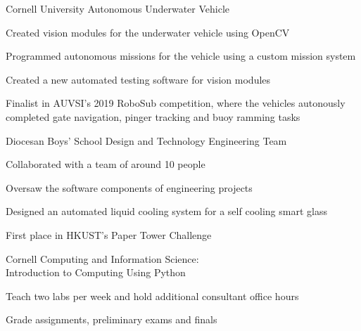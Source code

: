 \documentclass{resume}
\begin{document}
\begin{experience}
    \begin{entryleft}{Cornell University Autonomous Underwater Vehicle}
        \begin{description}
            \item Created vision modules for the underwater vehicle using OpenCV
            \item Programmed autonomous missions for the vehicle using a custom mission system
            \item Created a new automated testing software for vision modules
            \item Finalist in AUVSI's 2019 RoboSub competition, where the vehicles autonously completed gate navigation, pinger tracking and buoy ramming tasks
        \end{description}
    \end{entryleft}
    \begin{entryright}
    \end{entryright}

    \begin{entryleft}{Diocesan Boys' School Design and Technology Engineering Team}
        \begin{description}
            \item Collaborated with a team of around 10 people
            \item Oversaw the software components of engineering projects
            \item Designed an automated liquid cooling system for a self cooling smart glass
            \item First place in HKUST's Paper Tower Challenge
        \end{description}
    \end{entryleft}
    \begin{entryright}
    \end{entryright}

    \begin{entryleft}{Cornell Computing and Information Science: \\ Introduction to Computing Using Python}
        \begin{description}
            \item Teach two labs per week and hold additional consultant office hours
            \item Grade assignments, preliminary exams and finals
        \end{description}
    \end{entryleft}
    \begin{entryright}
    \end{entryright}
\end{experience}
\end{document}
